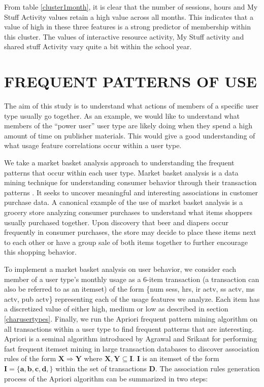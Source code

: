 \documentclass{acm_proc_article-sp}
\begin{document}
From table \ref{cluster1month}, it is clear that the number of sessions, hours and My Stuff Activity values retain a high value across all months. This indicates that a value of high in these three features is a strong predictor of membership within this cluster.  The values of interactive resource activity, My Stuff activity and shared stuff Activity vary quite a bit within the school year.

\section{FREQUENT PATTERNS OF USE}
The aim of this study is to understand what actions of members of a specific user type usually go together. As an example, we would like to understand what members of the ``power user'' user type are likely doing when they spend a high amount of time on publisher materials. This would give a good understanding of what usage feature correlations occur within a user type.

We take a market basket analysis approach to understanding the frequent patterns that occur within each user type. Market basket analysis is a data mining technique for understanding consumer behavior through their transaction patterns \cite{han2006data}. It seeks to uncover meaningful and interesting associations in customer purchase data. A canonical example of the use of  market basket analysis is a grocery store analyzing consumer purchases to understand what items shoppers usually purchased together. Upon discovery that beer and diapers occur frequently in consumer purchases, the store may decide to place these items next to each other or have a group sale of both items together to further encourage this shopping behavior.

To implement a market basket analysis on user behavior, we consider each member of a user type's monthly usage as a 6-item transaction (a transaction can also be referred to as an itemset) of the form \{num sess, hrs, ir actv, ss actv, ms actv, pub actv\} representing each of the usage features we analyze. Each item has a discretized value of either high, medium or low as described in section \ref{charusertypes}. Finally, we run the Apriori frequent pattern mining algorithm on all transactions within a user type to find frequent patterns that are interesting. Apriori is a seminal algorithm introduced by Agrawal and Srikant \cite{agrawal} for performing fast frequent itemset mining in large transaction databases to discover association rules of the form $\mathbf{{X} \Longrightarrow {Y}}$ where $\mathbf{X, Y \subseteq I}$. $\mathbf{I}$ is an itemset of the form $\mathbf{I = \{a,b,c,d,\}}$ within the set of transactions $\mathbf{D}$.
The association rules generation process of the Apriori algorithm can be summarized in two steps:
\end{document}
